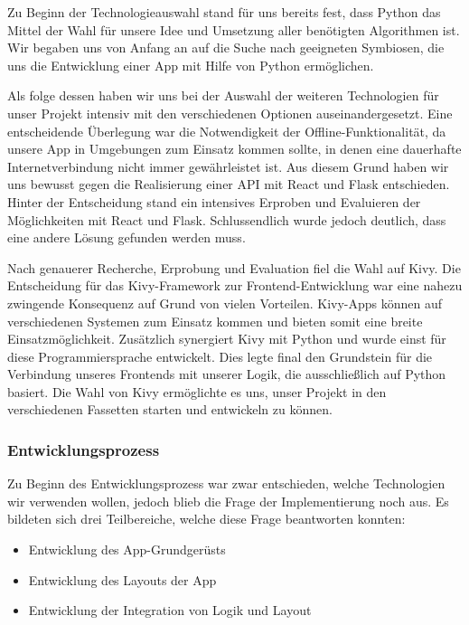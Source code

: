 		Zu Beginn der Technologieauswahl stand für uns bereits fest, dass Python das Mittel der Wahl für unsere Idee und Umsetzung aller benötigten Algorithmen ist. Wir begaben uns von Anfang an auf die Suche nach geeigneten Symbiosen, die uns die Entwicklung einer App mit Hilfe von Python ermöglichen.

		Als folge dessen haben wir uns bei der Auswahl der weiteren Technologien für unser Projekt intensiv mit den verschiedenen Optionen auseinandergesetzt. Eine entscheidende Überlegung war die Notwendigkeit der Offline-Funktionalität, da unsere App in Umgebungen zum Einsatz kommen sollte, in denen eine dauerhafte Internetverbindung nicht immer gewährleistet ist. Aus diesem Grund haben wir uns bewusst gegen die Realisierung einer API mit React und Flask entschieden. Hinter der Entscheidung stand ein intensives Erproben und Evaluieren der Möglichkeiten mit React und Flask. Schlussendlich wurde jedoch deutlich, dass eine andere Lösung gefunden werden muss.

		Nach genauerer Recherche, Erprobung und Evaluation fiel die Wahl auf Kivy. Die Entscheidung für das Kivy-Framework zur Frontend-Entwicklung war eine nahezu zwingende Konsequenz auf Grund von vielen Vorteilen. Kivy-Apps können auf verschiedenen Systemen zum Einsatz kommen und bieten somit eine breite Einsatzmöglichkeit. Zusätzlich synergiert Kivy mit Python und wurde einst für diese Programmiersprache entwickelt. Dies legte final den Grundstein für die Verbindung unseres Frontends mit unserer Logik, die ausschließlich auf Python basiert. Die Wahl von Kivy ermöglichte es uns, unser Projekt in den verschiedenen Fassetten starten und entwickeln zu können.
		
	\subsubsection{Entwicklungsprozess}
	\label{sssec:entwicklung}
		
		Zu Beginn des Entwicklungsprozess war zwar entschieden, welche Technologien wir verwenden wollen, jedoch blieb die Frage der Implementierung noch aus. Es bildeten sich drei Teilbereiche, welche diese Frage beantworten konnten:
		\begin{itemize}
			\item Entwicklung des App-Grundgerüsts
			\item Entwicklung des Layouts der App
			\item Entwicklung der Integration von Logik und Layout
		\end{itemize}
		
